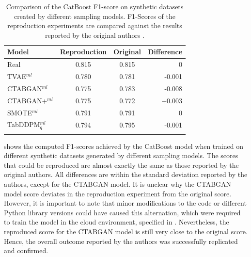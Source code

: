 \begin{table}[h]
	\centering
	\begin{tabular}{lccr}
		\toprule
		\textbf{Model}     & \textbf{Reproduction} & \textbf{Original} & \textbf{Difference} \\
		\midrule
		Real               & 0.815                 & 0.815             & 0                   \\
		TVAE$^{ml}$        & 0.780                 & 0.781             & -0.001              \\
		CTABGAN$^{ml}$     & 0.775                 & 0.783             & -0.008              \\
		CTABGAN+$^{ml}$    & 0.775                 & 0.772             & +0.003              \\
		SMOTE$^{ml}$       & 0.791                 & 0.791             & 0                   \\
		TabDDPM$^{ml}_{q}$ & 0.794                 & 0.795             & -0.001              \\
		\bottomrule
		\multicolumn{4}{c}{}\\[-0.6em]
	\end{tabular}
	\caption[Reproduction Original Results]{Comparison of the CatBoost F1-score on synthetic datasets created by different sampling models.
		F1-Scores of the reproduction experiments are compared against the results reported by the original authors \cite[Table 4, p. 8]{kotelnikov2022TabDDPMModellingTabular}.}
	\label{tab:reproduction}
\end{table}

 shows the computed F1-scores achieved by the CatBoost \gls{model} when trained on different synthetic datasets generated by different sampling models.
The scores that could be reproduced are almost exactly the same as those reported by the original authors.
All differences are within the standard deviation reported by the authors, except for the CTABGAN \gls{model}.
It is unclear why the CTABGAN \gls{model} score deviates in the reproduction experiment from the original score.
However, it is important to note that minor modifications to the code or different Python library versions could have caused this alternation, which were required to train the \gls{model} in the cloud environment, specified in .
Nevertheless, the reproduced score for the CTABGAN \gls{model} is still very close to the original score.
Hence, the overall outcome reported by the authors was successfully replicated and confirmed.


